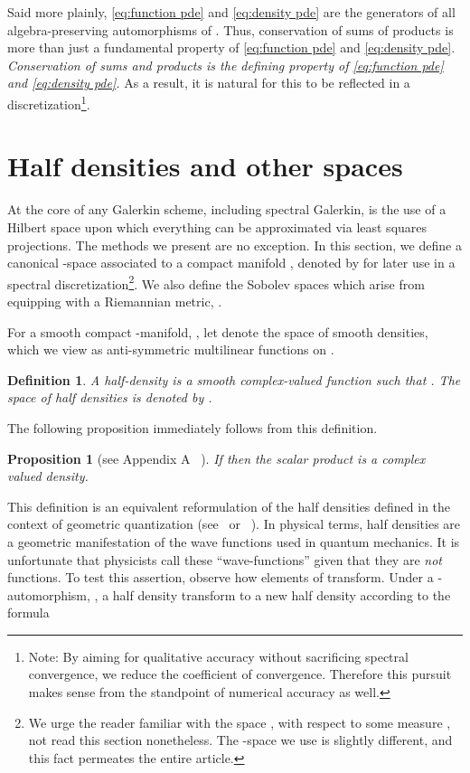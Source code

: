 \documentclass[final,leqno]{amsart}
\newtheorem{definition}[theorem]{Definition}
\newtheorem{proposition}[theorem]{Proposition}
\begin{document}
Said more plainly, \eqref{eq:function pde} and \eqref{eq:density pde} are the generators of all algebra-preserving automorphisms of .
Thus, conservation of sums of products is more than just a fundamental property of \eqref{eq:function pde} and \eqref{eq:density pde}.
\emph{Conservation of sums and products is the defining property of  \eqref{eq:function pde} and \eqref{eq:density pde}.}
As a result, it is natural for this to be reflected in a discretization\footnote{Note: By aiming for qualitative accuracy without sacrificing spectral convergence, we reduce the coefficient of convergence.
Therefore this pursuit makes sense from the standpoint of numerical accuracy as well.}.




\section{Half densities and other spaces}
\label{sec:half densities}


At the core of any Galerkin scheme, including spectral Galerkin, is the use of a Hilbert space upon which everything can be approximated via least squares projections.
The methods we present are no exception.
In this section, we define a canonical -space associated to a compact manifold , denoted by  for later use in a spectral discretization\footnote{
We urge the reader familiar with the space , with respect to some measure , not read this section nonetheless.
The -space we use is slightly different, and this fact permeates the entire article.}.
We also define the Sobolev spaces  which arise from equipping  with a Riemannian metric, .

For a smooth compact -manifold, , let  denote the space of smooth densities, which we view as anti-symmetric multilinear functions on .
\begin{definition}\label{def:half density}
	A half-density is a smooth complex-valued function 
	such that .
	The space of half densities is denoted by .
\end{definition}

The following proposition immediately follows from this definition.
\begin{proposition}[see Appendix A ~\cite{BatesWeinstein1997}] \label{prop:half densities}
	If  then the scalar product  is a complex valued density. 
\end{proposition}

This definition is an equivalent reformulation of the half densities defined in the context of geometric quantization (see~\cite[Chapter 4]{GuilleminSternberg1970} or ~\cite[Appendix A]{BatesWeinstein1997}).
In physical terms, half densities are a geometric manifestation of the wave functions used in quantum mechanics.
It is unfortunate that physicists call these ``wave-functions'' given that they are \emph{not} functions.
To test this assertion, observe how elements of  transform.
Under a -automorphism, , a half density  transform to a new half density  according to the formula
\end{document}
